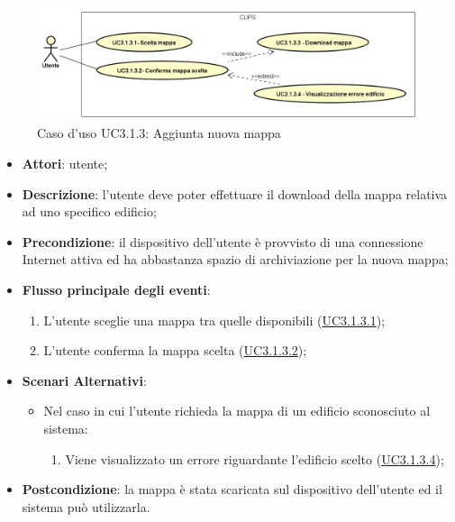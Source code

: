 \documentclass[../AnalisiDeiRequisiti.tex]{subfiles}
\begin{document}
        \begin{figure}[!h]
            \centering
            \includegraphics[scale=0.95, width=\textwidth]{img/UC3-1-3.png}
            \caption{Caso d'uso UC3.1.3: Aggiunta nuova mappa}\label{fig:UC3.1.3} 
        \end{figure}
\begin{itemize}
\item \textbf{Attori}: utente;
\item \textbf{Descrizione}: l'utente deve poter effettuare il download della mappa relativa ad uno specifico edificio; 
      \item \textbf{Precondizione}: il dispositivo dell'utente è provvisto di una connessione Internet attiva ed ha abbastanza spazio di archiviazione per la nuova mappa;

        \item \textbf{Flusso principale degli eventi}:
          \begin{enumerate}
          \item L'utente sceglie una mappa tra quelle disponibili (\hyperlink{UC3.1.3.1}{UC3.1.3.1});
          \item L'utente conferma la mappa scelta  (\hyperlink{UC3.1.3.2}{UC3.1.3.2});

      \end{enumerate}
    \item \textbf{Scenari Alternativi}:
    	\begin{itemize}
			\item Nel caso in cui l'utente richieda la mappa di un edificio sconosciuto al sistema:
			\begin{enumerate}
				\item Viene visualizzato un errore riguardante l'edificio scelto (\hyperlink{UC3.1.3.4}{UC3.1.3.4});
			\end{enumerate}
      	\end{itemize}
    \item \textbf{Postcondizione}: la mappa è stata scaricata sul dispositivo dell'utente ed il sistema può utilizzarla.
  \end{itemize}
\hypertarget{UC3.1.3.1}{}
\end{document}

